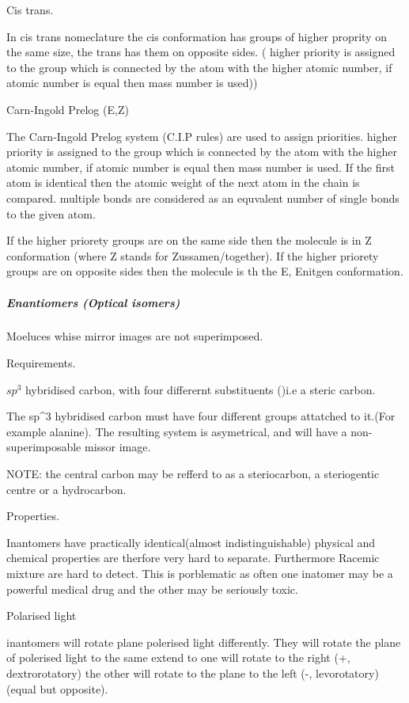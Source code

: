 \documentclass[]{article}
\let\oldsubparagraph\subparagraph
\renewcommand{\subparagraph}[1]{\oldsubparagraph{#1}\mbox{}}
\begin{document}
Cis trans.

In cis trans nomeclature the cis conformation has groups of higher
proprity on the same size, the trans has them on opposite sides. (
higher priority is assigned to the group which is connected by the atom
with the higher atomic number, if atomic number is equal then mass
number is used))

Carn-Ingold Prelog (E,Z)

The Carn-Ingold Prelog system (C.I.P rules) are used to assign
priorities. higher priority is assigned to the group which is connected
by the atom with the higher atomic number, if atomic number is equal
then mass number is used. If the first atom is identical then the atomic
weight of the next atom in the chain is compared. multiple bonds are
considered as an equvalent number of single bonds to the given atom.

If the higher priorety groups are on the same side then the molecule is
in Z conformation (where Z stands for Zussamen/together). If the higher
priorety groups are on opposite sides then the molecule is th the E,
Enitgen conformation.

\subparagraph{Enantiomers (Optical
isomers)}\label{enantiomers-optical-isomers}

Moeluces whise mirror images are not superimposed.

Requirements.

\(sp^3\) hybridised carbon, with four differernt substituents ()i.e a
steric carbon.

The sp\^{}3 hybridised carbon must have four different groups attatched
to it.(For example alanine). The resulting system is asymetrical, and
will have a non-superimposable missor image.

NOTE: the central carbon may be refferd to as a steriocarbon, a
steriogentic centre or a hydrocarbon.

Properties.

Inantomers have practically identical(almost indistinguishable) physical
and chemical properties are therfore very hard to separate. Furthermore
Racemic mixture are hard to detect. This is porblematic as often one
inatomer may be a powerful medical drug and the other may be seriously
toxic.

Polarised light

inantomers will rotate plane polerised light differently. They will
rotate the plane of polerised light to the same extend to one will
rotate to the right (+, dextrorotatory) the other will rotate to the
plane to the left (-, levorotatory)(equal but opposite).
\end{document}
